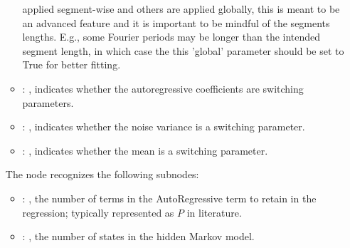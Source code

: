 \begin{itemize}
\begin{itemize}
            applied segment-wise and others are applied globally, this is meant to be an
            advanced feature and it is important to be mindful of the segments lengths.
            E.g., some Fourier periods may be longer than the intended segment length, in
            which case the this 'global' parameter should be set to True for better
            fitting. 
          \item {}: , 
            indicates whether the autoregressive coefficients are switching parameters. 
          \item {}: , 
            indicates whether the noise variance is a switching parameter. 
          \item {}: , 
            indicates whether the mean is a switching parameter. 
      \end{itemize}

      The  node recognizes the following subnodes:
      \begin{itemize}
        \item {}: , 
          the number of terms in the AutoRegressive term to retain in the
          regression; typically represented as $P$ in literature.

        \item {}: , 
          the number of states in the hidden Markov model.
      \end{itemize}


\end{itemize}
